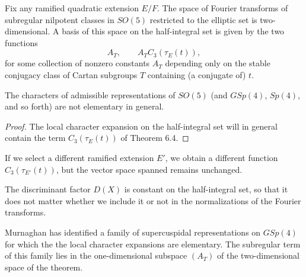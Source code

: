 \documentclass{amsart}
\begin{document}
  Fix any ramified quadratic extension $E/F$.
The space of Fourier transforms of subregular
nilpotent classes in $SO(5)$ restricted to the elliptic set is
two-dimensional.  A basis of this space on the half-integral set
is given by the two functions
$$A_T,\qquad A_T C_3(\tau_E(t)),$$
for some collection of nonzero constants $A_T$ depending only
on the stable conjugacy class of Cartan subgroups 
$T$ containing (a conjugate of) $t$.
\endproclaim

  The characters of admissible representations of
$SO(5)$ (and $GSp(4)$, $Sp(4)$, and so forth) are not elementary
in general.
\endproclaim

\begin{proof}  The local character expansion on the half-integral set
will in general contain the term $C_3(\tau_E(t))$ of Theorem 6.4.\end{proof}

\smallskip
If we select a different ramified extension $E'$, we obtain a 
different function $C_3(\tau_{E'}(t))$, but the vector space spanned
remains unchanged.

The discriminant factor $D(X)$ is constant on the half-integral
set, so that it does not matter whether we include it or
not in the normalizations of the Fourier transforms. 

 Murnaghan \cite{M1} has identified a family of supercuspidal
representations on $GSp(4)$ for which the the 
local character expansions
are elementary.  The subregular term of this family lies in the
one-dimensional subspace
$(A_T)$ of the two-dimensional space  of the theorem.
\end{document}
